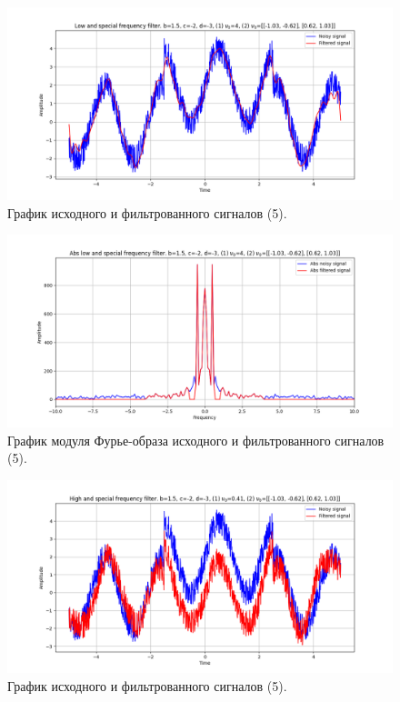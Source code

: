 \documentclass[a4paper, 12pt]{article}
\begin{document}
    \begin{figure}[H]
        \centering
        \includegraphics[scale=0.48]{5_3_u_flt_u_nospec.png}
        \captionsetup{skip=0pt}
        \caption{График исходного и фильтрованного сигналов (5).}
        \label{fig:fig07}
    \end{figure}
    \begin{figure}[!htb]
        \centering
        \includegraphics[scale=0.48]{5_3_abs_u_U_nospec.png}
        \captionsetup{skip=0pt}
        \caption{График модуля Фурье-образа исходного и фильтрованного сигналов (5).}
        \label{fig:fig08}
    \end{figure}
    \begin{figure}[!htb]
        \centering
        \includegraphics[scale=0.48]{5_4_u_flt_u_nospec.png}
        \captionsetup{skip=0pt}
        \caption{График исходного и фильтрованного сигналов (5).}
        \label{fig:fig09}
    \end{figure}
\end{document}

